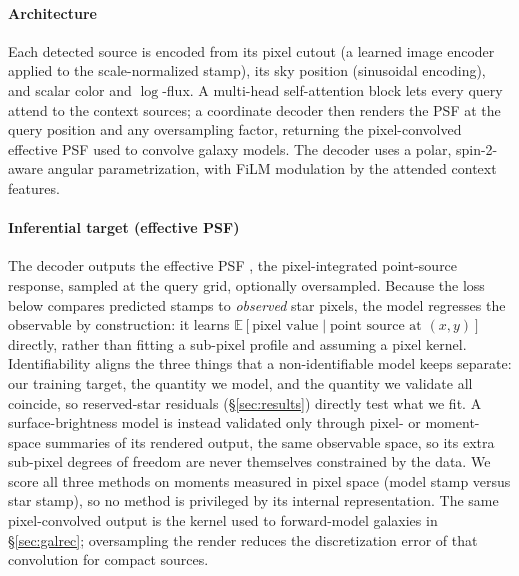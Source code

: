 \documentclass[twocolumn]{aastex701}
\begin{document}
\paragraph{Architecture} Each detected source is encoded from its pixel cutout (a learned
image encoder applied to the scale-normalized stamp), its sky position (sinusoidal
encoding), and scalar color and $\log$-flux. A multi-head self-attention block \citep{Vaswani2017} lets every
query attend to the context sources; a coordinate decoder then renders the PSF at the
query position and any oversampling factor, returning the pixel-convolved effective PSF
used to convolve galaxy models. The decoder uses a polar, spin-2-aware angular parametrization, with FiLM modulation
by the attended context features.

\paragraph{Inferential target (effective PSF)} The decoder outputs the effective PSF
\citep{AndersonKing2000}, the pixel-integrated point-source response, sampled at the
query grid, optionally oversampled. Because the loss below compares predicted stamps to
\emph{observed} star pixels, the model regresses the observable by construction: it
learns $\mathbb{E}[\text{pixel value}\mid\text{point source at }(x,y)]$ directly, rather
than fitting a sub-pixel profile and assuming a pixel kernel. Identifiability aligns the
three things that a non-identifiable model keeps separate: our training target, the
quantity we model, and the quantity we validate all coincide, so reserved-star residuals
(\S\ref{sec:results}) directly test what we fit. A surface-brightness model is instead
validated only through pixel- or moment-space summaries of its rendered output, the
same observable space, so its extra sub-pixel degrees of freedom are never themselves
constrained by the data. We score all three
methods on moments measured in pixel space (model stamp versus star stamp), so no method
is privileged by its internal representation. The
same pixel-convolved output is the kernel used to forward-model galaxies in
\S\ref{sec:galrec}; oversampling the render reduces the discretization error of that
convolution for compact sources.
\end{document}

